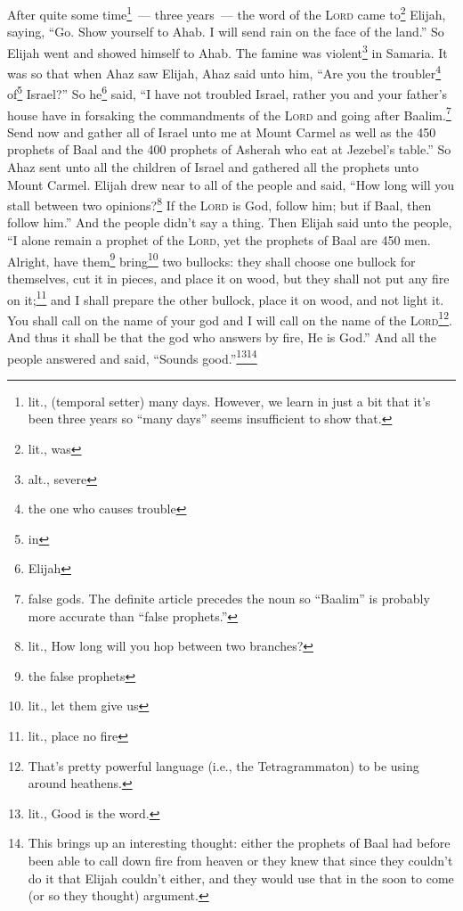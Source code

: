 
\begin{inparaenum}
     After quite some time\footnote{lit., (temporal setter) many days. However, we learn in just a bit that it's been three years so ``many days'' seems insufficient to show that.}~--- three years~--- the word of the \textsc{Lord} came to\footnote{lit., was} Elijah, saying, ``Go. Show yourself to Ahab. I will send rain on the face of the land.''%
     So Elijah went and showed himself to Ahab. The famine was violent\footnote{alt., severe} in Samaria.%
     It was so that when Ahaz saw Elijah, Ahaz said unto him, ``Are you the troubler\footnote{the one who causes trouble} of\footnote{in} Israel?''%
     So he\footnote{Elijah} said, ``I have not troubled Israel, rather you and your father's house have in forsaking the commandments of the \textsc{Lord} and going after Baalim.\footnote{false gods. The definite article precedes the noun so ``Baalim'' is probably more accurate than ``false prophets.''}%
     Send now and gather all of Israel unto me at Mount Carmel as well as the 450 prophets of Baal and the 400 prophets of Asherah who eat at Jezebel's table.''%
     So Ahaz sent unto all the children of Israel and gathered all the prophets unto Mount Carmel.%
     Elijah drew near to all of the people and said, ``How long will you stall between two opinions?\footnote{lit., How long will you hop between two branches?} If the \textsc{Lord} is God, follow him; but if Baal, then follow him.'' And the people didn't say a thing.%
     Then Elijah said unto the people, ``I alone remain a prophet of the \textsc{Lord}, yet the prophets of Baal are 450 men.%
     Alright, have them\footnote{the false prophets} bring\footnote{lit., let them give us} two bullocks: they shall choose one bullock for themselves, cut it in pieces, and place it on wood, but they shall not put any fire on it;\footnote{lit., place no fire} and I shall prepare the other bullock, place it on wood, and not light it.%
     You shall call on the name of your god and I will call on the name of the \textsc{Lord}\footnote{That's pretty powerful language (i.e., the Tetragrammaton) to be using around heathens.}. And thus it shall be that the god who answers by fire, He is God.'' And all the people answered and said, ``Sounds good.''\footnote{lit., Good is the word.}\footnote{This brings up an interesting thought: either the prophets of Baal had before been able to call down fire from heaven or they knew that since they couldn't do it that Elijah couldn't either, and they would use that in the soon to come (or so they thought) argument.}%

\end{inparaenum}
